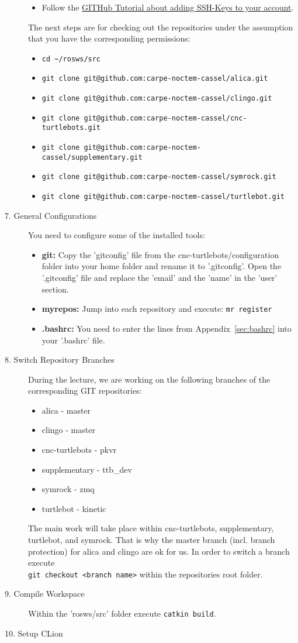 \begin{description}
\begin{itemize}
		\item Follow the \href{https://help.github.com/articles/adding-a-new-ssh-key-to-your-github-account/}{GITHub Tutorial about adding SSH-Keys to your account}.
	\end{itemize}
	The next steps are for checking out the repositories under the assumption that you have the corresponding permissions:
	\begin{itemize}
		\item \verb#cd ~/rosws/src#
		\item \verb#git clone git@github.com:carpe-noctem-cassel/alica.git#
		\item \verb#git clone git@github.com:carpe-noctem-cassel/clingo.git#
		\item \verb#git clone git@github.com:carpe-noctem-cassel/cnc-turtlebots.git#
		\item \verb#git clone git@github.com:carpe-noctem-cassel/supplementary.git#
		\item \verb#git clone git@github.com:carpe-noctem-cassel/symrock.git#
		\item \verb#git clone git@github.com:carpe-noctem-cassel/turtlebot.git#
	\end{itemize}
	\item[7. General Configurations] You need to configure some of the installed tools:
		\begin{itemize}
			\item \textbf{git:} Copy the 'gitconfig' file from the cnc-turtlebots/configuration folder into your home folder and rename it to '.gitconfig'. Open the '.gitconfig' file and replace the 'email' and the 'name' in the 'user' section.
			\item \textbf{myrepos:} Jump into each repository and execute: \verb#mr register#
			\item \textbf{.bashrc:} You need to enter the lines from Appendix~\ref{sec:bashrc} into your '.bashrc' file.
		\end{itemize}
	\item[8. Switch Repository Branches] During the lecture, we are working on the following branches of the corresponding GIT repositories:
	\begin{itemize}
		\item alica - master
		\item clingo - master
		\item cnc-turtlebots - pkvr
		\item supplementary - ttb\_dev
		\item symrock - zmq
		\item turtlebot - kinetic
	\end{itemize}
	The main work will take place within cnc-turtlebots, supplementary, turtlebot, and symrock. That is why the master branch (incl. branch protection) for alica and clingo are ok for us. In order to switch a branch execute\\\verb#git checkout <branch name># within the repositories root folder.
	\item[9. Compile Workspace] Within the 'rosws/src' folder execute \verb#catkin build#.
	\item[10. Setup CLion]
\end{description}

